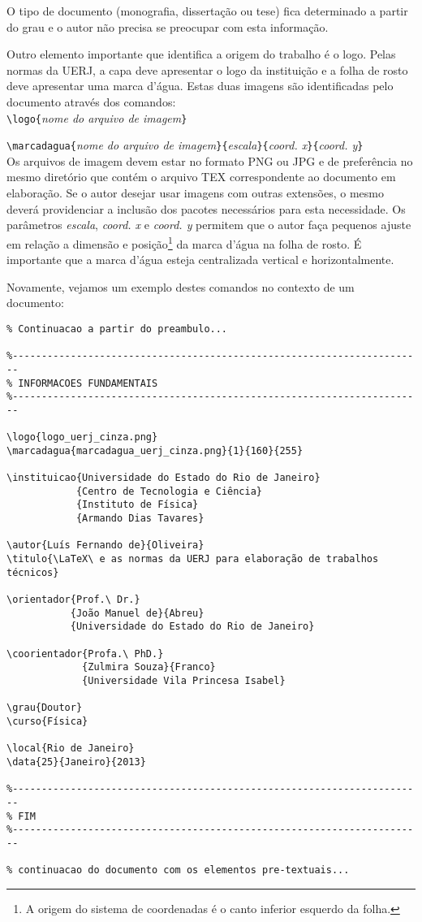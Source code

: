 \documentclass[a4paper,12pt,oneside,onecolumn]{article}
\newcommand{\comando}[1]{\texttt{\textbackslash #1}}
\newcommand{\param}[1]{\texttt{\{}\textsl{#1}\texttt{\}}}
\begin{document}
O tipo de documento (monografia, dissertação ou tese) fica determinado a partir do grau e o autor não precisa se preocupar com esta informação.

Outro elemento importante que identifica a origem do trabalho é o logo. Pelas normas da UERJ, a capa deve apresentar o logo da instituição e a folha de rosto deve apresentar uma marca d'água. Estas duas imagens são identificadas pelo documento através dos comandos:\\

\comando{logo}\param{nome do arquivo de imagem}

\comando{marcadagua}\param{nome do arquivo de imagem}\param{escala}\param{coord. x}\param{coord. y}\\

Os arquivos de imagem devem estar no formato PNG ou JPG e de preferência no mesmo diretório que contém o arquivo TEX correspondente ao documento em elaboração. Se o autor desejar usar imagens com outras extensões, o mesmo deverá providenciar a inclusão dos pacotes necessários para esta necessidade. Os parâmetros \textsl{escala}, \textsl{coord. x} e \textsl{coord. y} permitem que o autor faça pequenos ajuste em relação a dimensão e posição\footnote{A origem do sistema de coordenadas é o canto inferior esquerdo da folha.} da marca d'água na folha de rosto. É importante que a marca d'água esteja centralizada vertical e horizontalmente.

Novamente, vejamos um exemplo destes comandos no contexto de um documento:\\

\begin{verbatim}
% Continuacao a partir do preambulo...

%-----------------------------------------------------------------------
% INFORMACOES FUNDAMENTAIS
%-----------------------------------------------------------------------

\logo{logo_uerj_cinza.png}
\marcadagua{marcadagua_uerj_cinza.png}{1}{160}{255}

\instituicao{Universidade do Estado do Rio de Janeiro}
            {Centro de Tecnologia e Ciência}
            {Instituto de Física}
            {Armando Dias Tavares}

\autor{Luís Fernando de}{Oliveira}
\titulo{\LaTeX\ e as normas da UERJ para elaboração de trabalhos técnicos}

\orientador{Prof.\ Dr.}
           {João Manuel de}{Abreu}
           {Universidade do Estado do Rio de Janeiro}

\coorientador{Profa.\ PhD.}
             {Zulmira Souza}{Franco}
             {Universidade Vila Princesa Isabel}

\grau{Doutor}
\curso{Física}

\local{Rio de Janeiro}
\data{25}{Janeiro}{2013}

%-----------------------------------------------------------------------
% FIM
%-----------------------------------------------------------------------

% continuacao do documento com os elementos pre-textuais...
\end{verbatim}
\end{document}
